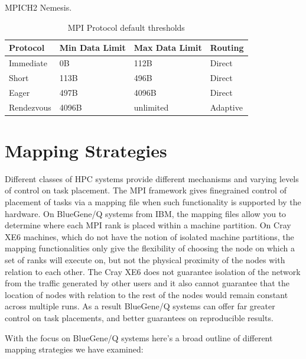 \documentclass[conference,10pt]{IEEEtran}
\begin{document}
MPICH2 Nemesis.

\begin{table}
  \caption{MPI Protocol default thresholds}
    \begin{tabular}{ | l | l | l | p{2cm} |}
    \hline
    Protocol   & Min Data Limit & Max Data Limit & Routing\\ \hline
    Immediate  &             0B &           112B & Direct\\ \hline
    Short      &           113B &           496B & Direct\\ \hline
    Eager      &           497B &          4096B & Direct\\ \hline
    Rendezvous &          4096B &      unlimited & Adaptive\\ \hline
    \hline
    \end{tabular}
\end{table}

\section{Mapping Strategies}

Different classes of HPC systems provide different mechanisms and varying levels of control on task placement.
The MPI framework gives finegrained control of placement of tasks via a mapping file when such functionality
is supported by the hardware. On BlueGene/Q systems from IBM, the mapping files allow you to determine where
each MPI rank is placed within a machine partition. On Cray XE6 machines, which do not have the notion of
isolated machine partitions, the mapping functionalities only give the flexibility of choosing the node on
which a set of ranks will execute on, but not the physical proximity of the nodes with relation to each other.
The Cray XE6 does not guarantee isolation of the network from the traffic generated by other users and it
also cannot guarantee that the location of nodes with relation to the rest of the nodes would remain constant
across multiple runs. As a result BlueGene/Q systems can offer far greater control on task placements, and
better guarantees on reproducible results.

With the focus on BlueGene/Q systems here's a broad outline of different mapping strategies we have examined:
\end{document}
